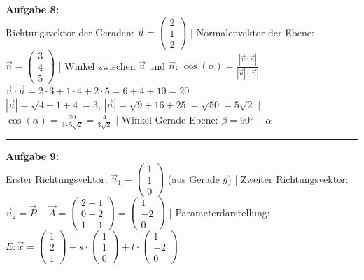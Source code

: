 \documentclass[12pt,a4paper]{article}
\newcommand{\vek}[1]{\vec{#1}}
\begin{document}
\textbf{Aufgabe 8:} \\
Richtungsvektor der Geraden: $\vek{u} = \begin{pmatrix}2\\1\\2\end{pmatrix}$ |
Normalenvektor der Ebene: $\vek{n} = \begin{pmatrix}3\\4\\5\end{pmatrix}$ |
Winkel zwischen $\vek{u}$ und $\vek{n}$: $\cos(\alpha) = \frac{|\vek{u} \cdot \vek{n}|}{|\vek{u}| \cdot |\vek{n}|}$ \\
$\vek{u} \cdot \vek{n} = 2\cdot3 + 1\cdot4 + 2\cdot5 = 6 + 4 + 10 = 20$ \\
$|\vek{u}| = \sqrt{4+1+4} = 3$, $|\vek{n}| = \sqrt{9+16+25} = \sqrt{50} = 5\sqrt{2}$ |
$\cos(\alpha) = \frac{20}{3 \cdot 5\sqrt{2}} = \frac{4}{3\sqrt{2}}$ |
Winkel Gerade-Ebene: $\beta = 90° - \alpha$
\begin{center}\rule{0.8\linewidth}{0.4pt}\end{center}

\textbf{Aufgabe 9:} \\
Erster Richtungsvektor: $\vek{u}_1 = \begin{pmatrix}1\\1\\0\end{pmatrix}$ (aus Gerade $g$) |
Zweiter Richtungsvektor: $\vek{u}_2 = \vek{P} - \vek{A} = \begin{pmatrix}2-1\\0-2\\1-1\end{pmatrix} = \begin{pmatrix}1\\-2\\0\end{pmatrix}$ |
Parameterdarstellung: $E: \vek{x} = \begin{pmatrix}1\\2\\1\end{pmatrix} + s \cdot \begin{pmatrix}1\\1\\0\end{pmatrix} + t \cdot \begin{pmatrix}1\\-2\\0\end{pmatrix}$
\begin{center}\rule{0.8\linewidth}{0.4pt}\end{center}
\end{document}
